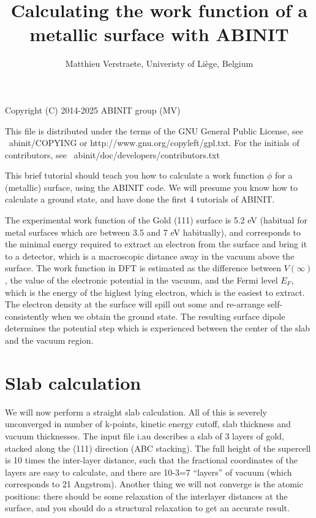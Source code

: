 \documentclass{report}
\begin{document}
\title{Calculating the work function of a metallic surface with ABINIT}

\author{Matthieu Verstraete, Univeristy of Li\`ege, Belgium}

\maketitle
Copyright (C) 2014-2025 ABINIT group (MV)

This file is distributed under the terms of the
GNU General Public License, see ~abinit/COPYING
or http://www.gnu.org/copyleft/gpl.txt.
For the initials of contributors, see ~abinit/doc/developers/contributors.txt

This brief tutorial should teach you how to calculate a work function $\phi$ for a (metallic) surface, using the ABINIT code. We will presume you know how to calculate a ground state, and have done the first 4 tutorials of ABINIT.

The experimental work function of the Gold (111) surface is 5.2 eV (habitual for metal surfaces which are between 3.5 and 7 eV habitually), and corresponds to the minimal energy required to extract an electron from the surface and bring it to a detector, which is a macroscopic distance away in the vacuum above the surface. The work function in DFT is estimated as the difference between $V(\infty)$, the value of the electronic potential in the vacuum, and the Fermi level $E_F$, which is the energy of the highest lying electron, which is the easiest to extract. The electron density at the surface will spill out some and re-arrange self-consistently when we obtain the ground state. The resulting surface dipole determines the potential step which is experienced between the center of the slab and the vacuum region.

\section{Slab calculation}
We will now perform a straight slab calculation. All of this is severely unconverged in number of k-points, kinetic energy cutoff,  slab thickness and vacuum thicknesses. The input file i.au describes a slab of 3 layers of gold, stacked along the (111) direction (ABC stacking). The full height of the supercell is 10 times the inter-layer distance, such that the fractional coordinates of the layers are easy to calculate, and there are 10-3=7 ``layers'' of vacuum (which corresponds to 21 Angstrom). Another thing we will not converge is the atomic positions: there should be some relaxation of the interlayer distances at the surface, and you should do a structural relaxation to get an accurate result.
\end{document}
